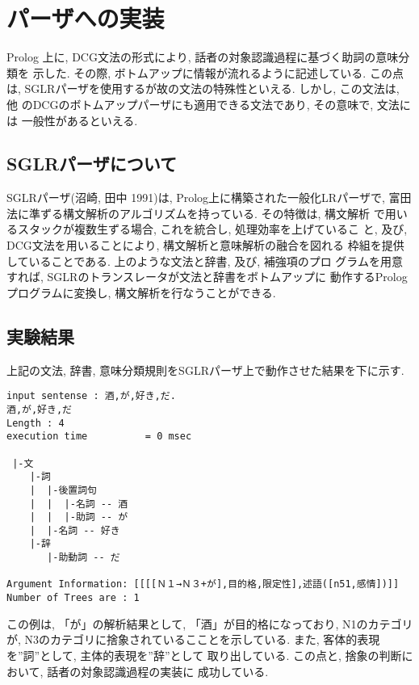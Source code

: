 \clearpage

\section{パーザへの実装}
Prolog 上に, DCG文法の形式により, 話者の対象認識過程に基づく助詞の意味分類を
示した. その際, ボトムアップに情報が流れるように記述している. この点は,
SGLRパーザを使用するが故の文法の特殊性といえる. しかし, この文法は, 他
のDCGのボトムアップパーザにも適用できる文法であり, その意味で, 文法には
一般性があるといえる. 

\subsection{SGLRパーザについて}
SGLRパーザ(沼崎, 田中 1991)は, Prolog上に構築された一般化LRパーザで, 
富田法に準ずる構文解析のアルゴリズムを持っている. その特徴は, 構文解析
で用いるスタックが複数生ずる場合, これを統合し, 処理効率を上げているこ
と, 及び, DCG文法を用いることにより, 構文解析と意味解析の融合を図れる
枠組を提供していることである. 上のような文法と辞書, 及び, 補強項のプロ
グラムを用意すれば, SGLRのトランスレータが文法と辞書をボトムアップに
動作するPrologプログラムに変換し, 構文解析を行なうことができる. 
\subsection{実験結果}
上記の文法, 辞書, 意味分類規則をSGLRパーザ上で動作させた結果を下に示す. 

\small
\begin{verbatim}
input sentense : 酒,が,好き,だ.
酒,が,好き,だ
Length : 4
execution time          = 0 msec

 |-文
    |-詞
    |  |-後置詞句
    |  |  |-名詞 -- 酒
    |  |  |-助詞 -- が
    |  |-名詞 -- 好き
    |-辞
       |-助動詞 -- だ

Argument Information: [[[[Ｎ１→Ｎ３+が],目的格,限定性],述語([n51,感情])]]
Number of Trees are : 1
\end{verbatim}
\normalsize
この例は, 「が」の解析結果として, 「酒」が目的格になっており, N1のカテゴリが, 
N3のカテゴリに捨象されているこことを示している. 
また, 客体的表現を''詞''として, 主体的表現を''辞''として
取り出している. この点と, 捨象の判断において, 話者の対象認識過程の実装に
成功している. 

